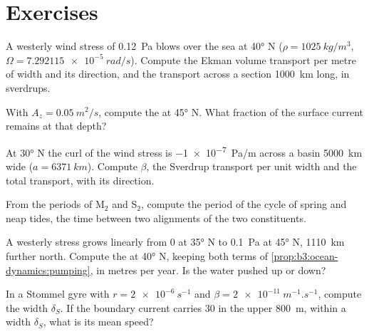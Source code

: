 \section{Exercises}

\begin{exercise}[$\star$]\label{exo:b3:ocean-dynamics:1}
A westerly wind stress of \qty{0.12}{Pa} blows over the sea at \ang{40} N
($\rho = \qty{1025}{kg/m^3}$, $\Omega = \qty{7.292115e-5}{rad/s}$).
Compute the Ekman volume transport per metre of width and its direction,
and the transport across a section \qty{1000}{km} long, in sverdrups.
\end{exercise}

\begin{exercise}[$\star$]\label{exo:b3:ocean-dynamics:2}
With $A_z = \qty{0.05}{m^2/s}$, compute the  at \ang{45} N. What
fraction of the surface current remains at that depth?
\end{exercise}

\begin{exercise}[$\star$]\label{exo:b3:ocean-dynamics:3}
At \ang{30} N the curl of the wind stress is \qty{-1e-7}{Pa/m} across a
basin \qty{5000}{km} wide ($a = \qty{6371}{km}$). Compute $\beta$, the
Sverdrup transport per unit width and the total transport, with its
direction.
\end{exercise}

\begin{exercise}[$\star$]\label{exo:b3:ocean-dynamics:4}
From the periods of M$_2$ and S$_2$, compute the period of the cycle of
spring and neap tides, the time between two alignments of the two
constituents.
\end{exercise}

\begin{exercise}[$\star\star$]\label{exo:b3:ocean-dynamics:5}
A westerly stress grows linearly from 0 at \ang{35} N to \qty{0.1}{Pa} at
\ang{45} N, \qty{1110}{km} further north. Compute the  at
\ang{40} N, keeping both terms of \cref{prop:b3:ocean-dynamics:pumping}, in
metres per year. Is the water pushed up or down?
\end{exercise}

\begin{exercise}[$\star\star$]\label{exo:b3:ocean-dynamics:6}
In a Stommel gyre with $r = \qty{2e-6}{s^{-1}}$ and $\beta =
\qty{2e-11}{m^{-1}.s^{-1}}$, compute the width $\delta_S$. If the boundary
current carries \qty{30}{\sverdrup} in the upper \qty{800}{m}, within a
width $\delta_S$, what is its mean speed?
\end{exercise}

